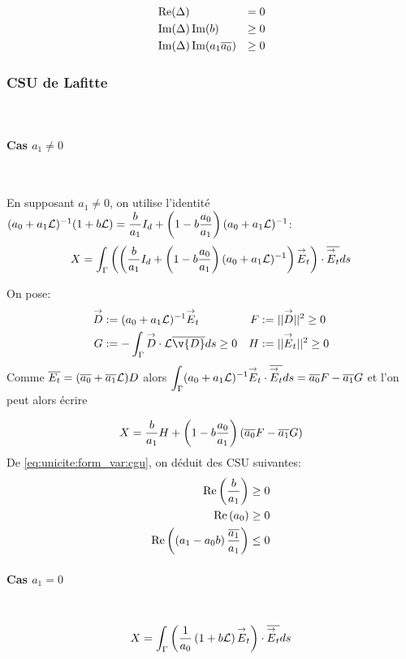       \begin{align}
        &\operatorname{Re}(\Delta) &= 0\\
        &\operatorname{Im}(\Delta)\operatorname{Im}(b) &\ge 0\\
        &\operatorname{Im}(\Delta)\operatorname{Im}(a_1{\overline{a_0}})&\ge 0
      \end{align}

    \subsubsection{CSU de Lafitte}
      ~
      \paragraph{Cas \(a_1\not=0\)}
        ~

        En supposant \(a_1 \not=0\), on utilise l'identité \((a_0 + a_1 \mathcal{L})^{-1}(1 + b \mathcal{L})  = \dfrac{b}{a_1} I_d + \left(1-b\dfrac{a_0}{a_1}\right)(a_0+a_1 \mathcal{L})^{-1}\):
        \[
          X = \int_\Gamma \left(\left(\dfrac{b}{a_1} I_d + \left(1-b\dfrac{a_0}{a_1}\right)(a_0+a_1 \mathcal{L})^{-1}\right){\overset{\rightarrow}{E}}_t\right) \cdot {\overline{{\overset{\rightarrow}{E}}_t}} ds
        \]

        On pose:
        \begin{align*}
          \vect D &:= (a_0 + a_1 \LL)^{-1}\vE_t & F&:= || \vect D || ^2 \ge 0  \\
          G&:= -\int_\Gamma \vect D \cdot \LL\conj{\v{D}} ds \ge 0 & H &:= || \vE_t || ^2 \ge 0
        \end{align*}
        Comme \({\overline{E_t}} = ({\overline{a_0}} + {\overline{a_1}}\mathcal{L})D\) alors \(\displaystyle\int_\Gamma (a_0 +a_1 \mathcal{L}) ^{-1}{\overset{\rightarrow}{E}}_t\cdot {\overline{{\overset{\rightarrow}{E}}_t}} ds = {\overline{a_0}} F - {\overline{a_1}} G\) et l'on peut alors écrire

        \begin{equation}
          \label{eq:unicite:form_var:decomp_cgu_ci1_a1}
          X = \dfrac{b}{a_1}H   + \left(1-b\dfrac{a_0}{a_1}\right)\left({\overline{a_0}} F - {\overline{a_1}} G\right)
        \end{equation}
        De \eqref{eq:unicite:form_var:cgu}, on déduit des CSU suivantes:
        \begin{align}
          \operatorname{Re}\left(\dfrac{b}{a_1}\right) \ge 0 \\
          \operatorname{Re}\left(a_0\right) \ge 0 \\
          \operatorname{Re}\left(\left(a_1-a_0 b\right)\dfrac{{\overline{a_1}}}{a_1}\right) \le 0
        \end{align}

      \paragraph{Cas \(a_1=0\)}
        ~
        \[
          X = \int_\Gamma \left( \dfrac{1}{a_0}\left(1+b\mathcal{L}\right){\overset{\rightarrow}{E}}_t\right) \cdot {\overline{{\overset{\rightarrow}{E}}_t}} ds
        \]

